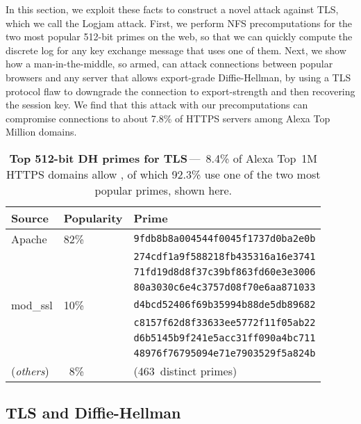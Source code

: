 In this section, we exploit these facts to construct a novel attack against
TLS\@, which we call the Logjam attack. First, we perform NFS precomputations
for the two most popular 512-bit primes on the web, so that we can quickly
compute the discrete log for any key exchange message that uses one of them.
Next, we show how a man-in-the-middle, so armed, can attack connections
between popular browsers and any server that allows export-grade
Diffie-Hellman, by using a TLS protocol flaw to downgrade the connection to
export-strength and then recovering the session key. We find that this attack
with our precomputations can compromise connections to about 7.8\% of HTTPS
servers among Alexa Top Million domains.

\begin{table}[t]
	\centering\small
	\begin{tabular}{lll}
          \toprule
          Source  & Popularity & Prime \\
          \midrule
          Apache   & 82\% & \tt 9fdb8b8a004544f0045f1737d0ba2e0b\\
                   &      & \tt 274cdf1a9f588218fb435316a16e3741\\
                   &      & \tt 71fd19d8d8f37c39bf863fd60e3e3006\\
                   &      & \tt 80a3030c6e4c3757d08f70e6aa871033\smallskip\\
          mod\_ssl & 10\% & \tt d4bcd52406f69b35994b88de5db89682\\
                   &      & \tt c8157f62d8f33633ee5772f11f05ab22\\
                   &      & \tt d6b5145b9f241e5acc31ff090a4bc711\\
                   &      & \tt 48976f76795094e71e7903529f5a824b\smallskip\\
          (\emph{others\/}) & \ 8\% & (463~distinct primes) \\
          \bottomrule
	\end{tabular}
    \caption{\textbf{Top 512-bit DH primes for TLS}\,---\,%
        8.4\% of Alexa Top~1M HTTPS domains allow \dheexp{}, of which 92.3\% use
        one of the two most popular primes, shown here.
    }
    \label{tab:export-primes}
\end{table}

\subsection{TLS and Diffie-Hellman}

